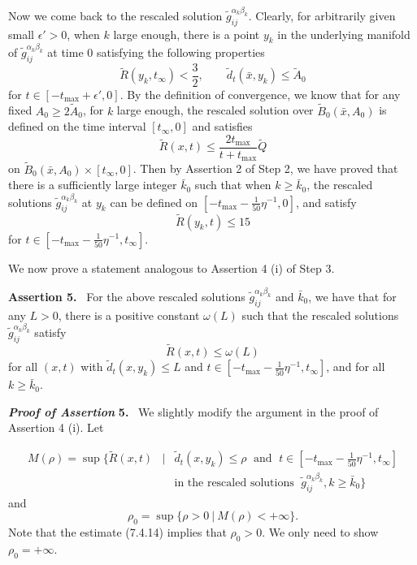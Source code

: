 Now we come back to the rescaled solution
$\widetilde{g}^{\alpha_k\beta_k}_{ij}$. Clearly, for arbitrarily
given small $\epsilon' > 0$, when $k$ large enough, there is a
point $y_k$ in the underlying manifold of
$\widetilde{g}^{\alpha_k\beta_k}_{ij}$ at time $0$ satisfying the
following properties \begin{equation}
\widetilde{R}(y_k,t_{\infty})<\frac{3}{2},\qquad
\widetilde{d}_{t}(\bar{x},y_k)\leq \widetilde{A}_0 %
\end{equation} for $t\in [-t_{\max} + \epsilon',0]$. By the definition of
convergence, we know that for any fixed $A_0 \geq
2\widetilde{A}_0$, for $k$ large enough, the rescaled solution
over $\widetilde{B}_{0}(\bar{x},A_0)$ is defined on the time
interval $[t_{\infty},0]$ and satisfies
$$
\widetilde{R}(x,t)\leq \frac{2t_{\max}}{t+t_{\max}}\widetilde{Q}
$$
on $\widetilde{B}_{0}(\bar{x},A_0)\times [t_{\infty},0]$. Then by
Assertion 2 of Step 2, we have proved that there is a sufficiently
large integer $\bar{k}_0$ such that when $k \geq \bar{k}_0$, the
rescaled solutions $\widetilde{g}^{\alpha_k\beta_k}_{ij}$ at $y_k$
can be defined on $[-t_{\max}-\frac{1}{50}\eta^{-1},0]$, and
satisfy
$$
\widetilde{R}(y_k,t)\leq 15
$$
for $t\in[-t_{\max}-\frac{1}{50}\eta^{-1},t_{\infty}]$.

We now prove a statement analogous to Assertion 4 (i) of Step 3.

\medskip
{\bf Assertion 5.} \ For the above rescaled solutions
$\widetilde{g}^{\alpha_k\beta_k}_{ij}$ and $\bar{k}_0$, we have
that for any $L>0$, there is a positive constant $\omega(L)$ such
that the rescaled solutions $\widetilde{g}^{\alpha_k\beta_k}_{ij}$
satisfy
$$
\widetilde{R}(x,t)\leq\omega(L)
$$
for all $(x,t)$ with $\tilde{d}_{t}(x,y_k)\leq L$ and $t\in
[-t_{\max}-\frac{1}{50}\eta^{-1},t_{\infty}]$, and for all $k \geq
\bar{k}_0$.

\medskip
{\bf \em Proof of Assertion} {\bf 5.} \ We slightly modify the
argument in the proof of Assertion 4 (i). Let

\begin{eqnarray*}
M(\rho)=\sup\Big\{\widetilde{R}(x,t) &  |&
\tilde{d}_t(x,y_k)\leq\rho\; \mbox{ and }\; t \in
[-t_{\max}-\frac{1}{50}\eta^{-1},t_{\infty}]\\
&   &   \mbox{in the rescaled solutions } \;
\widetilde{g}^{\alpha_k\beta_k}_{ij}, k\geq \bar{k}_0 \Big\}
\end{eqnarray*}
and
$$
\rho_0=\sup\{\rho > 0\ |\  M(\rho)<+\infty\}.
$$
Note that the estimate (7.4.14) implies that $\rho_0>0$. We only
need to show $\rho_0 = +\infty$.

